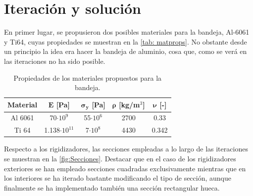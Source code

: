 \newpage
\section{Iteración y solución}  

En primer lugar, se propusieron dos posibles materiales para la bandeja, Al-6061 y Ti64, cuyas propiedades se muestran en la \autoref{tab: matprops}. No obstante desde un principio la idea era hacer la bandeja de aluminio, cosa que, como se verá en las iteraciones no ha sido posible.

\begin{table}[H]
\centering
\caption{Propiedades de los materiales propuestos para la bandeja.}
\label{tab: matprops}
\begin{tabular}{c c c c c}
\toprule
\multicolumn{1}{c}{\textbf{Material}} & \multicolumn{1}{c}{$\boldsymbol{E}$ [Pa]}  & \multicolumn{1}{c}{\textbf{ $\boldsymbol{\sigma_{y}}$} [Pa]} & \multicolumn{1}{c}{$\boldsymbol{\rho}$ [kg/m$^{3}$]} & \multicolumn{1}{c}{$\boldsymbol{\nu}$ [-]} \\ \midrule
 Al 6061 &70$\cdot 10^{9}$  & 55$\cdot 10^{6}$ & 2700 & 0.33 \\
 Ti 64 & 1.138$\cdot10^{11}$ & 7$\cdot10^{8}$& 4430 &0.342 \\ \bottomrule
\end{tabular}
\end{table}

Respecto a los rigidizadores, las secciones empleadas a lo largo de las iteraciones se muestran en la \autoref{fig:Secciones}. Destacar que en el caso de los rigidizadores exteriores se han empleado secciones cuadradas exclusivamente mientras que en los interiores se ha iterado bastante modificando el tipo de sección, aunque finalmente se ha implementado también una sección rectangular hueca. 

